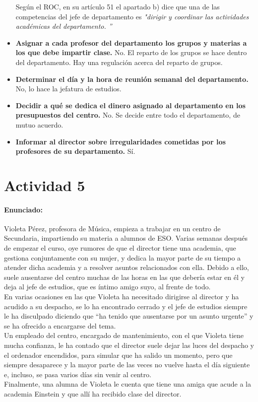 \begin{itemize}
	Según el ROC, en su artículo 51 el apartado b) dice que una de las competencias del jefe de departamento es \textit{"dirigir y coordinar las actividades académicas del departamento.
”}
	\item \textbf{Asignar a cada profesor del departamento los grupos y materias a los que debe impartir clase.
}
	No.
 El reparto de los grupos se hace dentro del departamento.
 Hay una regulación acerca del reparto de grupos.

	\item \textbf{Determinar el día y la hora de reunión semanal del departamento.
}
	No, lo hace la jefatura de estudios.
 
	\item \textbf{Decidir a qué se dedica el dinero asignado al departamento en los presupuestos del centro.
}
	No.
 Se decide entre todo el departamento, de mutuo acuerdo.

	\item \textbf{Informar al director sobre irregularidades cometidas por los profesores de su departamento.
}
	Sí.

\end{itemize}

\newpage
\section*{Actividad 5}

\paragraph{Enunciado: }
Violeta Pérez, profesora de Música, empieza a trabajar en un centro de Secundaria, impartiendo su materia a
alumnos de ESO.
 Varias semanas después de empezar el curso, oye rumores de que el director tiene una
academia, que gestiona conjuntamente con su mujer, y dedica la mayor parte de su tiempo a atender dicha
academia y a resolver asuntos relacionados con ella.
 Debido a ello, suele ausentarse del centro muchas de las
horas en las que debería estar en él y deja al jefe de estudios, que es íntimo amigo suyo, al frente de todo.
\\
En varias ocasiones en las que Violeta ha necesitado dirigirse al director y ha acudido a su despacho, se lo ha
encontrado cerrado y el jefe de estudios siempre le ha disculpado diciendo que “ha tenido que ausentarse por
un asunto urgente” y se ha ofrecido a encargarse del tema.
\\
Un empleado del centro, encargado de mantenimiento, con el que Violeta tiene mucha confianza, le ha
contado que el director suele dejar las luces del despacho y el ordenador encendidos, para simular que ha
salido un momento, pero que siempre desaparece y la mayor parte de las veces no vuelve hasta el día siguiente
e, incluso, se pasa varios días sin venir al centro.
\\
Finalmente, una alumna de Violeta le cuenta que tiene una amiga que acude a la academia Einstein y que allí
ha recibido clase del director.

